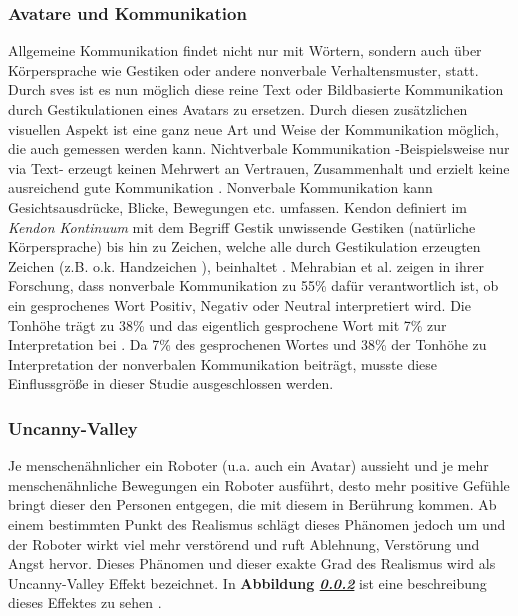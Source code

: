\documentclass[a4paper,11pt]{article}%
\renewcommand{\\}{\vspace*{0.5\baselineskip} \newline}
\begin{document}
\subsubsection{Avatare und Kommunikation}
Allgemeine Kommunikation findet nicht nur mit Wörtern, sondern auch über Körpersprache wie Gestiken oder andere nonverbale Verhaltensmuster, statt. Durch \ac{sve}s ist es nun möglich diese reine Text oder Bildbasierte Kommunikation durch Gestikulationen eines Avatars zu ersetzen. Durch diesen zusätzlichen visuellen Aspekt ist eine ganz neue Art und Weise der Kommunikation möglich, die auch gemessen werden kann. 
Nichtverbale Kommunikation -Beispielsweise nur via Text- erzeugt keinen Mehrwert an Vertrauen, Zusammenhalt und erzielt keine ausreichend gute Kommunikation \citep[S.81]{haslam2003social}.
Nonverbale Kommunikation kann Gesichtsausdrücke, Blicke, Bewegungen etc. umfassen. Kendon definiert im \textit{Kendon Kontinuum} mit dem Begriff \glqq{}Gestik\dq{} unwissende Gestiken (natürliche Körpersprache) bis hin zu \glqq{}Zeichen\dq{}, welche alle durch Gestikulation erzeugten Zeichen (z.B. o.k. Handzeichen ), beinhaltet \citep[37]{mcneill1992hand}.
Mehrabian et al. zeigen in ihrer Forschung, dass nonverbale Kommunikation zu 55\% dafür verantwortlich ist, ob ein gesprochenes Wort Positiv, Negativ oder Neutral interpretiert wird. Die Tonhöhe trägt zu 38\% und das eigentlich gesprochene Wort mit 7\% zur Interpretation bei \citep[43]{mehrabian1971silent}.
Da 7\% des gesprochenen Wortes und 38\% der Tonhöhe zu Interpretation der nonverbalen Kommunikation beiträgt, musste diese Einflussgröße in dieser Studie ausgeschlossen werden.

\subsubsection{Uncanny-Valley}
\label{Uncanny-Valley}
Je menschenähnlicher ein Roboter (u.a. auch ein Avatar) aussieht und je mehr menschenähnliche Bewegungen ein Roboter ausführt, desto mehr positive Gefühle bringt dieser den Personen entgegen, die mit diesem in Berührung kommen. Ab einem bestimmten Punkt des Realismus schlägt dieses Phänomen jedoch um und der Roboter wirkt viel mehr verstörend und ruft  Ablehnung, Verstörung und Angst hervor. Dieses Phänomen und dieser exakte Grad des Realismus wird als Uncanny-Valley Effekt bezeichnet. In \textbf{Abbildung \textit{\ref{Uncanny-Valley}}} ist eine beschreibung dieses Effektes zu sehen \citep[S.352-353]{gast2011unheimliche}.
\end{document}
